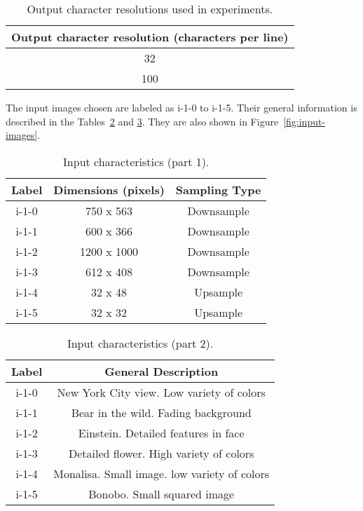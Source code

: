 \documentclass[]{IEEEtran}
\begin{document}
\begin{table}[H]
\centering
\begin{center}
\begin{tabular}{ |c| } 
 \hline
 Output character resolution (characters per line)\\
 \hline
 32 \\ 
 \hline
 100  \\
 \hline
\end{tabular}
 \label{table:resolutions}
 \caption{Output character resolutions used in experiments.}
\end{center}
\end{table}

The input images chosen are labeled as i-1-0 to i-1-5. Their general information is described in the Tables~\ref{table:inputs-1} and \ref{table:inputs-2}. They are also shown in Figure~\ref{fig:input-images}.

\begin{table}[H]
\centering
\begin{tabular}{ |c|c|c| } 
 \hline
 Label & Dimensions (pixels) & Sampling Type\\
 \hline
 i-1-0 & 750 x 563 & Downsample\\  
 \hline
 i-1-1 & 600 x 366 & Downsample\\
 \hline
 i-1-2 & 1200 x 1000 & Downsample\\
 \hline
 i-1-3 & 612 x 408 & Downsample\\
 \hline
 i-1-4 & 32 x 48 & Upsample \\
 \hline
 i-1-5 & 32 x 32 & Upsample\\
 \hline
\end{tabular}
 \label{table:inputs-1}
 \caption{Input characteristics (part 1).}
\end{table}

\begin{table}[H]
\centering
\begin{tabular}{ |c|c| } 
 \hline
 Label & General Description\\
 \hline
 i-1-0 & New York City view. Low variety of colors\\  
 \hline
 i-1-1 & Bear in the wild. Fading background\\
 \hline
 i-1-2 & Einstein. Detailed features in face \\
 \hline
 i-1-3 & Detailed flower. High variety of colors \\
 \hline
 i-1-4 & Monalisa. Small image. low variety of colors \\
 \hline
 i-1-5 & Bonobo. Small squared image \\
 \hline
\end{tabular}
 \label{table:inputs-2}
 \caption{Input characteristics (part 2).}
\end{table}
\end{document}
